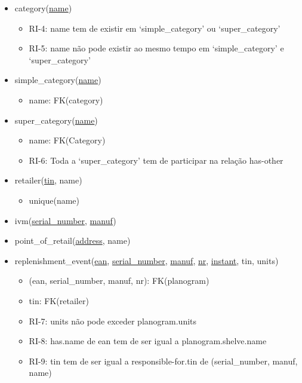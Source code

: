 \documentclass{article}
\newcommand{\bpoint}{\item[$\bullet$]}
\newenvironment{myitemize}
{ \begin{itemize}
	\setlength{\itemsep}{5pt}
	\setlength{\parskip}{0pt}
	\setlength{\parsep}{0pt} }
{ \end{itemize}	}
\begin{document}
\begin{myitemize}
		\vspace{2mm}

	 	\item[]{category(\underline{name})}
		\begin{myitemize}
			\bpoint RI-4: name tem de existir em `simple\_category' ou `super\_category'
			\bpoint RI-5: name não pode existir ao mesmo tempo em `simple\_category' e `super\_category'
		\end{myitemize}

		\vspace{2mm}

	 	\item[] simple\_category(\underline{name})
		\begin{myitemize}
			\bpoint name: FK(category)
		\end{myitemize}

		\vspace{2mm}

	 	\item[] super\_category(\underline{name})
		\begin{myitemize}
			\bpoint name: FK(Category)
			\bpoint RI-6: Toda a `super\_category' tem de participar na relação has-other
		\end{myitemize}

		\vspace{2mm}

	 	\item[] retailer(\underline{tin}, name)
		\begin{myitemize}
			\bpoint unique(name)
		\end{myitemize}

		\vspace{2mm}

		\item[] ivm(\underline{serial\_number}, \underline{manuf})

		\vspace{2mm}

		\item[] point\_of\_retail(\underline{address}, name)

		\vspace{2mm}

	\item[] replenishment\_event(\underline{ean}, \underline{serial\_number}, \underline{manuf}, \underline{nr}, \underline{instant}, tin, units)
		\begin{myitemize}
			\bpoint (ean, serial\_number, manuf, nr): FK(planogram)
			\bpoint tin: FK(retailer)
			\bpoint RI-7: units não pode exceder planogram.units
			\bpoint RI-8: has.name de ean tem de ser igual a planogram.shelve.name
			\bpoint RI-9: tin tem de ser igual a responsible-for.tin de (serial\_number, manuf, name)


\end{myitemize}
\end{myitemize}
\end{document}
